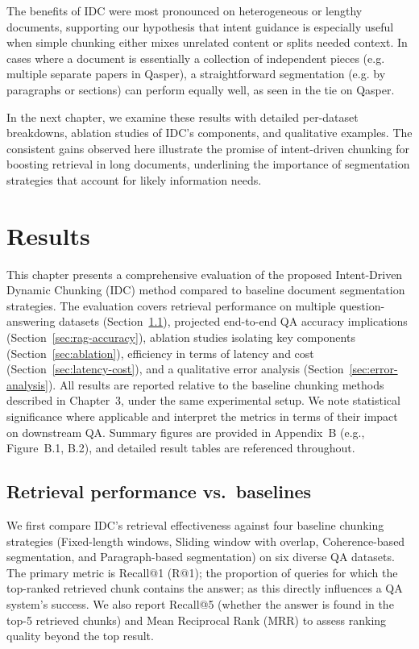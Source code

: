 \documentclass[12pt,a4paper]{report}
\begin{document}
The benefits of IDC were most pronounced on heterogeneous or lengthy documents, supporting our hypothesis that intent guidance is especially useful when simple chunking either mixes unrelated content or splits needed context. In cases where a document is essentially a collection of independent pieces (e.g. multiple separate papers in Qasper), a straightforward segmentation (e.g. by paragraphs or sections) can perform equally well, as seen in the tie on Qasper. 

In the next chapter, we examine these results with detailed per-dataset breakdowns, ablation studies of IDC's components, and qualitative examples. The consistent gains observed here illustrate the promise of intent-driven chunking for boosting retrieval in long documents, underlining the importance of segmentation strategies that account for likely information needs.

\chapter{Results}

This chapter presents a comprehensive evaluation of the proposed Intent-Driven Dynamic Chunking (IDC) method compared to baseline document segmentation strategies. The evaluation covers retrieval performance on multiple question-answering datasets (Section~\ref{sec:retrieval-performance}), projected end-to-end QA accuracy implications (Section~\ref{sec:rag-accuracy}), ablation studies isolating key components (Section~\ref{sec:ablation}), efficiency in terms of latency and cost (Section~\ref{sec:latency-cost}), and a qualitative error analysis (Section~\ref{sec:error-analysis}). All results are reported relative to the baseline chunking methods described in Chapter~3, under the same experimental setup. We note statistical significance where applicable and interpret the metrics in terms of their impact on downstream QA. Summary figures are provided in Appendix~B (e.g., Figure~B.1, B.2), and detailed result tables are referenced throughout.

\section{Retrieval performance vs.\ baselines}\label{sec:retrieval-performance}

We first compare IDC's retrieval effectiveness against four baseline chunking strategies (Fixed-length windows, Sliding window with overlap, Coherence-based segmentation, and Paragraph-based segmentation) on six diverse QA datasets. The primary metric is Recall@1 (R@1); the proportion of queries for which the top-ranked retrieved chunk contains the answer; as this directly influences a QA system's success. We also report Recall@5 (whether the answer is found in the top-5 retrieved chunks) and Mean Reciprocal Rank (MRR) to assess ranking quality beyond the top result.
\end{document}
